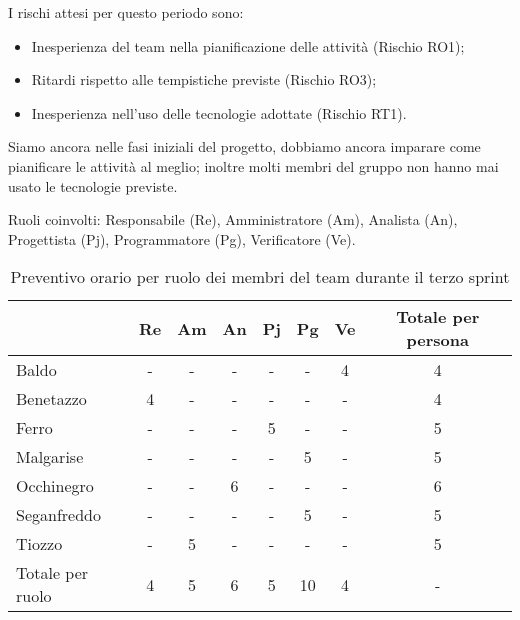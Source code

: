I rischi attesi per questo periodo sono:
\begin{itemize}
    \item Inesperienza del team nella pianificazione delle attività (Rischio RO1);
    \item Ritardi rispetto alle tempistiche previste (Rischio RO3);
    \item Inesperienza nell'uso delle tecnologie adottate (Rischio RT1).
\end{itemize}
Siamo ancora nelle fasi iniziali del progetto, dobbiamo ancora imparare come pianificare le attività al meglio; inoltre molti membri del gruppo non hanno mai usato le tecnologie previste.

Ruoli coinvolti: Responsabile (Re), Amministratore (Am), Analista (An), Progettista (Pj), Programmatore (Pg), Verificatore (Ve).
\begin{table}[!h]
    \centering
    \begin{tabular}{ | l | c | c | c | c | c | c | c | }
        \hline
        \textbf{} & \textbf{Re} & \textbf{Am} &\textbf{An} & \textbf{Pj} & \textbf{Pg} & \textbf{Ve} & \textbf{Totale per persona} \\
        \hline
        Baldo            &  -   &  -   &  -   &  -   &  -   &  4   &  4   \\
        Benetazzo        &  4   &  -   &  -   &  -   &  -   &  -   &  4   \\
        Ferro            &  -   &  -   &  -   &  5   &  -   &  -   &  5   \\
        Malgarise        &  -   &  -   &  -   &  -   &  5   &  -   &  5   \\
        Occhinegro       &  -   &  -   &  6   &  -   &  -   &  -   &  6   \\
        Seganfreddo      &  -   &  -   &  -   &  -   &  5   &  -   &  5   \\
        Tiozzo           &  -   &  5   &  -   &  -   &  -   &  -   &  5   \\
        \hline
        Totale per ruolo &  4   &  5   &  6   &  5   & 10   &  4   &  -   \\
        \hline
    \end{tabular}
    \caption{Preventivo orario per ruolo dei membri del team durante il terzo sprint}
    \label{tab:21}
\end{table}


